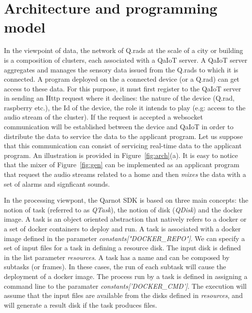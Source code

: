\documentclass[10pt, conference, compsocconf]{IEEEtran}
\begin{document}
\section{Architecture and programming model} \label{Model}

In the viewpoint of data, the network of Q.rads at the scale of a city or building is a composition of clusters, each 
associated with a QaIoT server. A QaIoT server aggregates and manages the sensory data issued from the Q.rads to which it is 
connected. A program deployed on the a connected device (or a Q.rad) can get access to these data. For this purpose, 
it must first register to the QaIoT server in sending an Http request where it declines: the nature of the device (Q.rad, 
raspberry etc.), the Id of the device, the role it intends to play (e.g: access to the audio stream of the cluster). If the 
request is accepted a websocket communication will  be established between the device and QaIoT in order to distribute the data 
to service the data to the applicant program. Let us suppose that this communication can consist of servicing real-time data 
to the applicant program. An illustration is provided in Figure~\ref{fig:arch}(a). 
It is easy to notice that the mixer of Figure~\ref{fig:gen} can be implemented as an applicant program that request the audio streams  
related to a home and then {\it mixes} the data with a set of alarms and signficant sounds.

In the processing viewpont, the Qarnot SDK is based on three main concepts: the notion of task (referred to as {\it QTask}), 
the notion of disk ({\it QDisk}) and the docker image. A task is an object oriented abstraction that natively refers to a 
docker or a set of docker containers to deploy and run. A task is associated with a docker image defined in the 
parameter {\it constants["DOCKER\_REPO"]}. We can specify a set of input files for a task in defining a resource disk. 
The input disk is defined in the list parameter {\it resources}. A task has a name and can be composed by subtasks (or frames).  
In these cases, the run of each subtask will cause the deployment of a docker image. The process run by a task is defined in 
assigning a command line to the paramater {\it constants['DOCKER\_CMD']}. The execution will assume that the input files are available 
from the disks defined in {\it resources}, and will generate a result disk if the task produces files.
\end{document}
